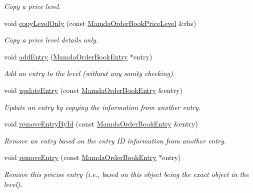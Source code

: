 \begin{CompactItemize}
\begin{CompactList}\small\item\em Copy a price level. \item\end{CompactList}\item 
void \hyperlink{classWombat_1_1MamdaOrderBookPriceLevel_5582554127b099dca98aa1698d8e4192}{copy\-Level\-Only} (const \hyperlink{classWombat_1_1MamdaOrderBookPriceLevel}{Mamda\-Order\-Book\-Price\-Level} \&rhs)
\begin{CompactList}\small\item\em Copy a price level details only. \item\end{CompactList}\item 
void \hyperlink{classWombat_1_1MamdaOrderBookPriceLevel_7d8a3426981170899154fd5893767d23}{add\-Entry} (\hyperlink{classWombat_1_1MamdaOrderBookEntry}{Mamda\-Order\-Book\-Entry} $\ast$entry)
\begin{CompactList}\small\item\em Add an entry to the level (without any sanity checking). \item\end{CompactList}\item 
void \hyperlink{classWombat_1_1MamdaOrderBookPriceLevel_90e46840d812ec88a9f2f787f1b39ac4}{update\-Entry} (const \hyperlink{classWombat_1_1MamdaOrderBookEntry}{Mamda\-Order\-Book\-Entry} \&entry)
\begin{CompactList}\small\item\em Update an entry by copying the information from another entry. \item\end{CompactList}\item 
void \hyperlink{classWombat_1_1MamdaOrderBookPriceLevel_d1d7856abe96bc4117b9ca747eb874ef}{remove\-Entry\-By\-Id} (const \hyperlink{classWombat_1_1MamdaOrderBookEntry}{Mamda\-Order\-Book\-Entry} \&entry)
\begin{CompactList}\small\item\em Remove an entry based on the entry ID information from another entry. \item\end{CompactList}\item 
void \hyperlink{classWombat_1_1MamdaOrderBookPriceLevel_60064fdfb428a31859a01b1e33ad820f}{remove\-Entry} (const \hyperlink{classWombat_1_1MamdaOrderBookEntry}{Mamda\-Order\-Book\-Entry} $\ast$entry)
\begin{CompactList}\small\item\em Remove this precise entry (i.e., based on this object being the exact object in the level). \item\end{CompactList}\item 

\end{CompactItemize}
